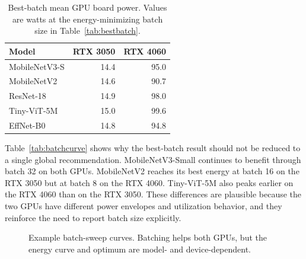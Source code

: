 \documentclass[conference]{IEEEtran}
\begin{document}
\begin{table}[t]
\centering
\caption{Best-batch mean GPU board power. Values are watts at the
energy-minimizing batch size in Table~\ref{tab:bestbatch}.}
\label{tab:bestpower}
\scriptsize
\begin{tabular}{@{}lrr@{}}
\toprule
Model & RTX 3050 & RTX 4060\\
\midrule
MobileNetV3-S & 14.4 & 95.0\\
MobileNetV2 & 14.6 & 90.7\\
ResNet-18 & 14.9 & 98.0\\
Tiny-ViT-5M & 15.0 & 99.6\\
EffNet-B0 & 14.8 & 94.8\\
\bottomrule
\end{tabular}
\end{table}

Table~\ref{tab:batchcurve} shows why the best-batch result should not be
reduced to a single global recommendation. MobileNetV3-Small continues to
benefit through batch 32 on both GPUs. MobileNetV2 reaches its best energy at
batch 16 on the RTX 3050 but at batch 8 on the RTX 4060. Tiny-ViT-5M also
peaks earlier on the RTX 4060 than on the RTX 3050. These differences are
plausible because the two GPUs have different power envelopes and utilization
behavior, and they reinforce the need to report batch size explicitly.

\begin{figure}[t]
\centering
{}
\caption{Example batch-sweep curves. Batching helps both GPUs, but the energy
curve and optimum are model- and device-dependent.}
\label{fig:batch-energy}
\end{figure}
\end{document}
